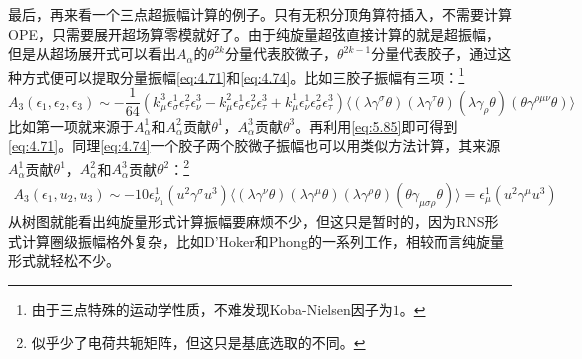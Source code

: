 最后，再来看一个三点超振幅计算的例子。只有无积分顶角算符插入，不需要计算OPE，只需要展开超场算零模就好了。由于纯旋量超弦直接计算的就是超振幅，但是从超场展开式可以看出$A_\alpha$的$\theta^{2k}$分量代表胶微子，$\theta^{2k-1}$分量代表胶子，通过这种方式便可以提取分量振幅\ref{eq:4.71}和\ref{eq:4.74}。比如三胶子振幅有三项：\footnote{由于三点特殊的运动学性质，不难发现Koba-Nielsen因子为$1$。}
\begin{equation}
		A_{3}(\epsilon_1,\epsilon_2,\epsilon_3) \sim -\frac{1}{64} \left( k_{\mu}^{3} \epsilon_{\sigma}^{1} \epsilon_{\tau}^{2} \epsilon_{\nu}^{3} - k_{\mu}^{2} \epsilon_{\sigma}^{1} \epsilon_{\nu}^{2} \epsilon_{\tau}^{3} + k_{\mu}^{1} \epsilon_{\nu}^{1} \epsilon_{\sigma}^{2} \epsilon_{\tau}^{3} \right) \big\langle (\lambda \gamma^{\sigma} \theta)(\lambda \gamma^{\tau} \theta)(\lambda \gamma_{\rho} \theta)(\theta \gamma^{\rho\mu\nu} \theta) \big\rangle
\end{equation}
比如第一项就来源于$A^1_\alpha$和$A^2_\alpha$贡献$\theta^1$，$A^3_\alpha$贡献$\theta^3$。再利用\ref{eq:5.85}即可得到\ref{eq:4.71}。同理\ref{eq:4.74}一个胶子两个胶微子振幅也可以用类似方法计算，其来源$A^1_\alpha$贡献$\theta^1$，$A^2_\alpha$和$A^3_\alpha$贡献$\theta^2$：\footnote{似乎少了电荷共轭矩阵，但这只是基底选取的不同。}
\begin{equation}
	\begin{aligned}
		A_{3}(\epsilon_1,u_2,u_3) 
		\sim -10 \epsilon_{\nu_1}^1 (u^2 \gamma^\sigma u^3) \big\langle (\lambda \gamma^{\nu} \theta)(\lambda \gamma^{\mu} \theta)(\lambda \gamma^{\rho} \theta)(\theta \gamma_{\mu\sigma\rho} \theta) \big\rangle 
		= \epsilon_\mu^1 (u^2 \gamma^\mu u^3)
	\end{aligned}
\end{equation}
从树图就能看出纯旋量形式计算振幅要麻烦不少，但这只是暂时的，因为RNS形式计算圈级振幅格外复杂，比如D'Hoker和Phong的一系列工作\cite{DHoker:2001kkt,DHoker:2001qqx,DHoker:2001foj,DHoker:2001jaf,DHoker:2005dys,DHoker:2005vch,DHoker:2002hof}，相较而言纯旋量形式就轻松不少\cite{Berkovits:2005df,Berkovits:2005ng}。

